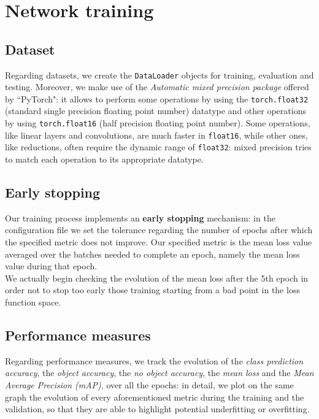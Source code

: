 \documentclass[../report.tex]{subfiles}
\begin{document}
\section{Network training}\label{s:network-training}

\subsection{Dataset}\label{ss:dataset}
Regarding datasets, we create the \texttt{DataLoader} objects for training, evaluation and testing.
\noindent
Moreover, we make use of the \textit{Automatic mixed precision package} offered by ``PyTorch": it allows to perform some operations by using the \texttt{torch.float32} (standard single precision floating point number) datatype and other operations by using \texttt{torch.float16} (half precision floating point number).\newline
Some operations, like linear layers and convolutions, are much faster in \texttt{float16}, while other ones, like reductions, often require the dynamic range of \texttt{float32}: mixed precision tries to match each operation to its appropriate datatype.

\subsection{Early stopping}\label{ss:early}
Our training process implements an \textbf{early stopping} mechanism: in the configuration file we set the tolerance regarding the number of epochs after which the specified metric does not improve.
Our specified metric is the mean loss value averaged over the batches needed to complete an epoch, namely the mean loss value during that epoch.\\
\noindent
We actually begin checking the evolution of the mean loss after the 5th epoch in order not to stop too early those training starting from a bad point in the loss function space.

\subsection{Performance measures}\label{ss:measures}
Regarding performance measures, we track the evolution of the \textit{class prediction accuracy}, the \textit{object accuracy}, the \textit{no object accuracy}, the \textit{mean loss} and the \textit{Mean Average Precision (mAP)}, over all the epochs: in detail, we plot on the same graph the evolution of every aforementioned metric during the training and the validation, so that they are able to highlight potential underfitting or overfitting.
\end{document}
